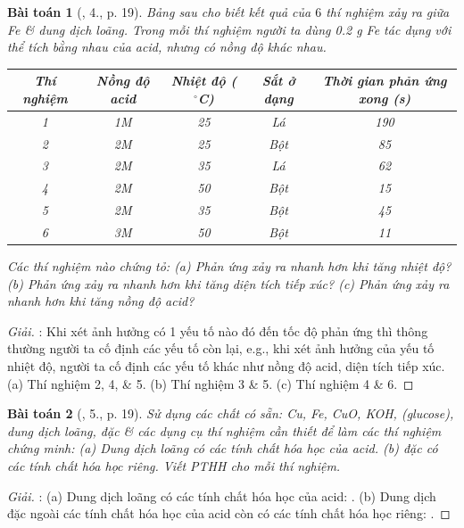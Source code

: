 \documentclass{article}
\newtheorem{baitoan}{Bài toán}
\begin{document}
\begin{baitoan}[\cite{SGK_Hoa_Hoc_9}, 4., p. 19]
	Bảng sau cho biết kết quả của $6$ thí nghiệm xảy ra giữa {\rm Fe} \& dung dịch {\rm{}} loãng. Trong mỗi thí nghiệm người ta dùng {\rm0.2 g Fe} tác dụng với thể tích bằng nhau của acid, nhưng có nồng độ khác nhau.
	\begin{table}[H]
		\centering
		\begin{tabular}{|c|c|c|c|c|}
			\hline
			Thí nghiệm & Nồng độ acid & Nhiệt độ (${}^\circ$C) & Sắt ở dạng & Thời gian phản ứng xong (s) \\
			\hline
			1 & 1M & 25 & Lá & 190 \\
			\hline
			2 & 2M & 25 & Bột & 85 \\
			\hline
			3 & 2M & 35 & Lá & 62 \\
			\hline
			4 & 2M & 50 & Bột & 15 \\
			\hline
			5 & 2M & 35 & Bột & 45 \\
			\hline
			6 & 3M & 50 & Bột & 11 \\
			\hline
		\end{tabular}
	\end{table}
	\noindent Các thí nghiệm nào chứng tỏ: (a) Phản ứng xảy ra nhanh hơn khi tăng nhiệt độ? (b) Phản ứng xảy ra nhanh hơn khi tăng diện tích tiếp xúc? (c) Phản ứng xảy ra nhanh hơn khi tăng nồng độ acid?
\end{baitoan}

\begin{proof}[Giải]
	\cite[p. 15]{Ninh_giai_BT_Hoa_Hoc_9}: Khi xét ảnh hưởng có 1 yếu tố nào đó đến tốc độ phản ứng thì thông thường người ta cố định các yếu tố còn lại, e.g., khi xét ảnh hưởng của yếu tố nhiệt độ, người ta cố định các yếu tố khác như nồng độ acid, diện tích tiếp xúc. (a) Thí nghiệm 2, 4, \& 5. (b) Thí nghiệm 3 \& 5. (c) Thí nghiệm 4 \& 6.
\end{proof}

\begin{baitoan}[\cite{SGK_Hoa_Hoc_9}, 5., p. 19]
	Sử dụng các chất có sẵn: {\rm Cu, Fe, CuO, KOH, } (glucose), dung dịch {\rm{}} loãng, {\rm{}} đặc \& các dụng cụ thí nghiệm cần thiết để làm các thí nghiệm chứng minh: (a) Dung dịch {\rm{}} loãng có các tính chất hóa học của acid. (b) {\rm{}} đặc có các tính chất hóa học riêng. Viết {\rm PTHH} cho mỗi thí nghiệm.
\end{baitoan}

\begin{proof}[Giải]
	\cite[p. 15]{Ninh_giai_BT_Hoa_Hoc_9}: (a) Dung dịch  loãng có các tính chất hóa học của acid: . (b) Dung dịch  đặc ngoài các tính chất hóa học của acid còn có các tính chất hóa học riêng: .
\end{proof}
\end{document}
